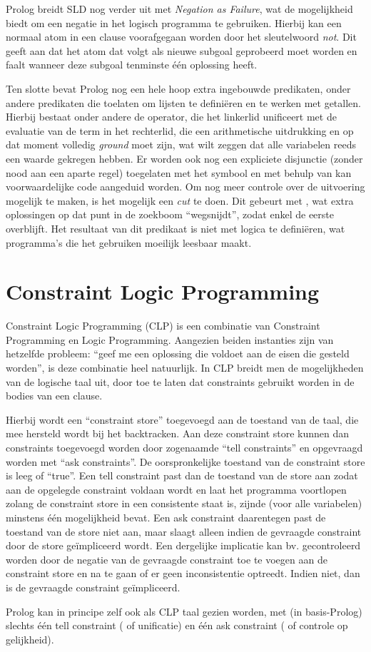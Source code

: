 Prolog breidt SLD nog verder uit met {\em Negation as Failure}, wat de mogelijkheid biedt om een negatie in het logisch programma te gebruiken. Hierbij kan een normaal atom in een clause voorafgegaan worden door het sleutelwoord {\em not}. Dit geeft aan dat het atom dat volgt als nieuwe subgoal geprobeerd moet worden en faalt wanneer deze subgoal tenminste \'e\'en oplossing heeft.

Ten slotte bevat Prolog nog een hele hoop extra ingebouwde predikaten, onder andere predikaten die toelaten om lijsten te defini\"eren en te werken met getallen. Hierbij bestaat onder andere de  operator, die het linkerlid unificeert met de evaluatie van de term in het rechterlid, die een arithmetische uitdrukking en op dat moment volledig {\em ground} moet zijn, wat wilt zeggen dat alle variabelen reeds een waarde gekregen hebben. Er worden ook nog een expliciete disjunctie (zonder nood aan een aparte regel) toegelaten met het \code{;} symbool en met behulp van \code{->} kan voorwaardelijke code aangeduid worden. Om nog meer controle over de uitvoering mogelijk te maken, is het mogelijk een {\em cut} te doen. Dit gebeurt met \code{!}, wat extra oplossingen op dat punt in de zoekboom ``wegsnijdt'', zodat enkel de eerste overblijft. Het resultaat van dit predikaat is niet met logica te defini\"eren, wat programma's die het gebruiken moeilijk leesbaar maakt.

\section{Constraint Logic Programming}

Constraint Logic Programming (CLP) is een combinatie van Constraint Programming en Logic Programming. Aangezien beiden instanties zijn van hetzelfde probleem: ``geef me een oplossing die voldoet aan de eisen die gesteld worden'', is deze combinatie heel natuurlijk. In CLP breidt men de mogelijkheden van de logische taal uit, door toe te laten dat constraints gebruikt worden in de bodies van een clause. 

Hierbij wordt een ``constraint store'' toegevoegd aan de toestand van de taal, die mee hersteld wordt bij het backtracken. Aan deze constraint store kunnen dan constraints toegevoegd worden door zogenaamde ``tell constraints'' en opgevraagd worden met ``ask constraints''. De oorspronkelijke toestand van de constraint store is leeg of ``true''. Een tell constraint past dan de toestand van de store aan zodat aan de opgelegde constraint voldaan wordt en laat het programma voortlopen zolang de constraint store in een consistente staat is, zijnde (voor alle variabelen) minstens \'e\'en mogelijkheid bevat. Een ask constraint daarentegen past de toestand van de store niet aan, maar slaagt alleen indien de gevraagde constraint door de store ge\"impliceerd wordt. Een dergelijke implicatie kan bv. gecontroleerd worden door de negatie van de gevraagde constraint toe te voegen aan de constraint store en na te gaan of er geen inconsistentie optreedt. Indien niet, dan is de gevraagde constraint ge\"impliceerd.

Prolog kan in principe zelf ook als CLP taal gezien worden, met (in basis-Prolog) slechts \'e\'en tell constraint (\code{=} of unificatie) en \'e\'en ask constraint (\code{==} of controle op gelijkheid).

